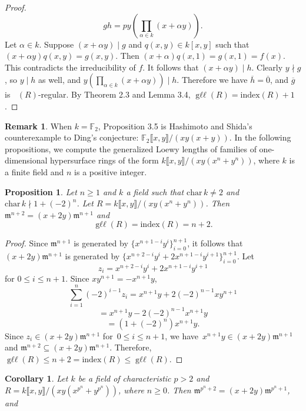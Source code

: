 \documentclass{amsart}
\newtheorem{proposition}[theorem]{Proposition}
\newtheorem{corollary}[theorem]{Corollary}
\theoremstyle{definition}
\theoremstyle{definition}
\newtheorem{remark}[theorem]{Remark}
\DeclareMathOperator{\gr}{\text{gr}_{\mathfrak{m}}}
\DeclareMathOperator{\gll}{\text{g}\ell\ell}
\numberwithin{equation}{section}
\theoremstyle{definition}
\begin{document}
{\begin{proof}
\[
gh=py(\prod\limits_{\alpha \in k}(x+\alpha y)). 
\]\text{}\newline
Let $\alpha \in k$. Suppose $(x+\alpha y) \mid g$ and $q(x,y) \in k[x,y]$ such that $(x+\alpha y)q(x,y)=g(x,y)$. Then $(x+\alpha)q(x,1)=g(x,1)=f(x)$. This contradicts the irreducibility of $f$. \newline\newline It follows that $(x+\alpha y) \mid h$. Clearly $y \nmid g$, so $y \mid h$ as well, and $y(\prod\limits_{\alpha \in k}(x+\alpha y)) \mid h$. Therefore we have $\overline{h}=\overline{0}$, and $\overline{g}$ is $\gr(R)$-regular. By Theorem 2.3 and Lemma 3.4, $\gll(R) = \text{index}(R)+1$. \end{proof} \text{}\newline
\begin{remark} When $k=\mathbb{F}_{2}$, Proposition 3.5 is Hashimoto and Shida's counterexample to Ding's conjecture: $\mathbb{F}_{2}\llbracket x,y \rrbracket/(xy(x+y))$. In the following propositions, we compute the generalized Loewy lengths of families of one-dimensional hypersurface rings of the form $k\llbracket x,y \rrbracket/(xy(x^{n}+y^{n}))$, where $k$ is a finite field and $n$ is a positive integer.\end{remark}\text{}
\begin{proposition} Let $n \geq 1$ and $k$ a field such that $\text{char}\,k \neq 2$ and $\text{char}\,k \nmid 1+(-2)^{n}$. Let  $R=k\llbracket x,y\rrbracket/(xy(x^n+y^n))$. Then $\mathfrak{m}^{n+2}=(x+2y)\mathfrak{m}^{n+1}$ and 
\[\gll(R)=\text{index}(R)=n+2.
\] \end{proposition}
\begin{proof} Since $\mathfrak{m}^{n+1}$ is generated by $\{x^{n+1-i}y^{i} \}_{i=0}^{n+1}$, it follows that
$(x+2y)\mathfrak{m}^{n+1}$ is generated by $\{x^{n+2-i}y^{i}+2x^{n+1-i}y^{i+1}\}_{i=0}^{n+1}$.
Let \[z_{i}=x^{n+2-i}y^{i}+2x^{n+1-i}y^{i+1}\]\newline for $0 \leq i \leq n+1$. Since $xy^{n+1}=-x^{n+1}y$, \newline
\[\sum_{i=1}^{n} (-2)^{i-1}z_{i}=x^{n+1}y+2(-2)^{n-1}xy^{n+1}
\]
\[=x^{n+1}y-2(-2)^{n-1}x^{n+1}y
\] 
\[=(1+(-2)^{n})x^{n+1}y.
\]\text{} \newline Since $z_i \in (x+2y)\mathfrak{m}^{n+1}$ for\, $0 \leq i \leq n+1$, we have\, $x^{n+1}y \in (x+2y)\mathfrak{m}^{n+1}$ and $\mathfrak{m}^{n+2} \subseteq (x+2y)\mathfrak{m}^{n+1}$. Therefore, $\gll(R) \leq n+2=\text{index}(R) \leq \gll(R)$. \end{proof}\text{}
\begin{corollary} Let $k$ be a field of characteristic $p>2$ and $R=k\llbracket x,y \rrbracket /(xy(x^{p^{n}}+y^{p^{n}}))$, where $n \geq 0$. Then $\mathfrak{m}^{p^{n}+2}=(x+2y)\mathfrak{m}^{p^{n}+1}$, and 

\end{corollary}}
\end{document}
